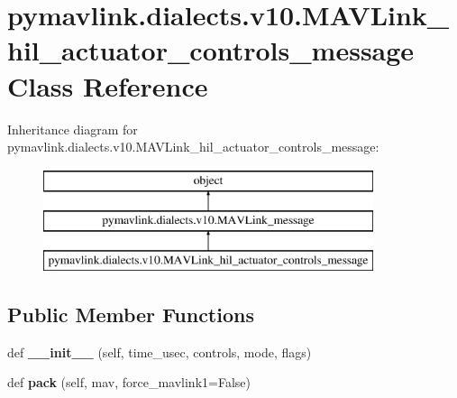 \hypertarget{classpymavlink_1_1dialects_1_1v10_1_1MAVLink__hil__actuator__controls__message}{}\section{pymavlink.\+dialects.\+v10.\+M\+A\+V\+Link\+\_\+hil\+\_\+actuator\+\_\+controls\+\_\+message Class Reference}
\label{classpymavlink_1_1dialects_1_1v10_1_1MAVLink__hil__actuator__controls__message}
Inheritance diagram for pymavlink.\+dialects.\+v10.\+M\+A\+V\+Link\+\_\+hil\+\_\+actuator\+\_\+controls\+\_\+message\+:\begin{figure}[H]
\begin{center}
\leavevmode
\includegraphics[height=3.000000cm]{classpymavlink_1_1dialects_1_1v10_1_1MAVLink__hil__actuator__controls__message}
\end{center}
\end{figure}
\subsection*{Public Member Functions}
\begin{DoxyCompactItemize}
\item 
\mbox{\label{classpymavlink_1_1dialects_1_1v10_1_1MAVLink__hil__actuator__controls__message_ab99d73e3f572e6fdb91c4bf701911050}} 
def {\bfseries \+\_\+\+\_\+init\+\_\+\+\_\+} (self, time\+\_\+usec, controls, mode, flags)
\item 
\mbox{\label{classpymavlink_1_1dialects_1_1v10_1_1MAVLink__hil__actuator__controls__message_a350c60f7899baea4ed5e7dd33b53a3e3}} 
def {\bfseries pack} (self, mav, force\+\_\+mavlink1=False)
\end{DoxyCompactItemize}
